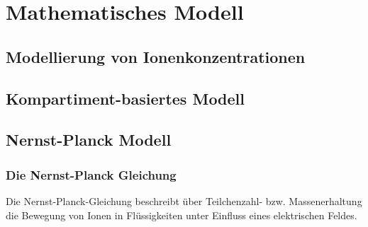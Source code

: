 \documentclass[11pt,a4paper,twoside]{article}
\author{Jakob Kreft}
\begin{document}
\part{Mathematisches Modell}

\chapter{Modellierung von Ionenkonzentrationen}

\chapter{Kompartiment-basiertes Modell}

\chapter{Nernst-Planck Modell}

\section{Die Nernst-Planck Gleichung}
\begin{flushleft}
Die Nernst-Planck-Gleichung beschreibt über Teilchenzahl- bzw. Massenerhaltung die Bewegung von Ionen in Flüssigkeiten unter Einfluss eines elektrischen Feldes.
\end{flushleft}
\end{document}
